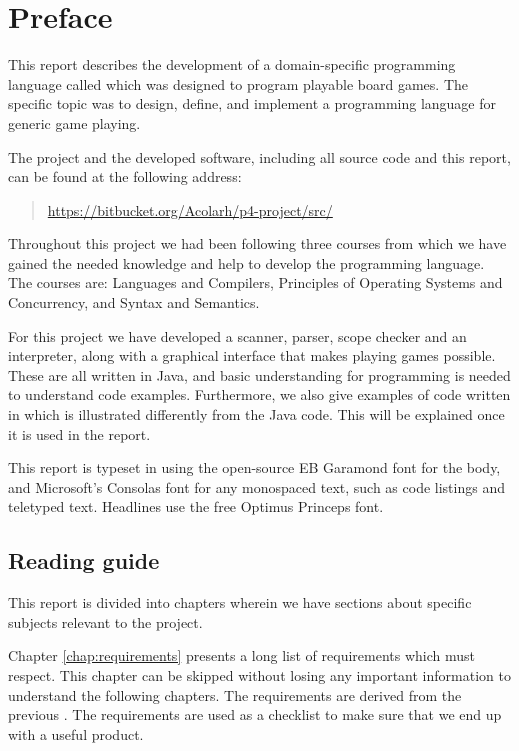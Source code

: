 \chapter*{Preface}
\label{chap:preface}

This report describes the development of a domain-specific programming
language called \productname{} which was designed to program playable board games. The 
specific topic was to design, define, and implement a programming language for 
generic game playing. 

The project and the developed software, including all source code and
this report, can be found at the following address:

\begin{quote}
  \url{https://bitbucket.org/Acolarh/p4-project/src/}  
\end{quote}

Throughout this project we had been following three courses from which we have
gained the needed knowledge and help to develop the programming language. The
courses are: Languages and Compilers, Principles of Operating Systems and
Concurrency, and Syntax and Semantics.

For this project we have developed a scanner, parser, scope checker and
an interpreter, along with a graphical interface that makes playing
games possible. These are all written in Java, and basic understanding
for programming is needed to understand code examples. Furthermore,
we also give examples of code written in \productname{} which is
illustrated differently from the Java code. This will be explained once
it is used in the report.

This report is typeset in \XeTeX{} using the open-source EB Garamond
font for the body, and Microsoft's Consolas font for any monospaced
text, such as code listings and teletyped text. Headlines use the free
Optimus Princeps font.

\section*{Reading guide}

This report is divided into chapters wherein we have sections about specific
subjects relevant to the project.

Chapter \ref{chap:requirements} presents a long list of requirements which
\productname{} must respect. This chapter can be skipped without losing any
important information to understand the following chapters. The requirements are 
derived from the previous . The requirements are used as
a checklist to make sure that we end up with a useful product.

